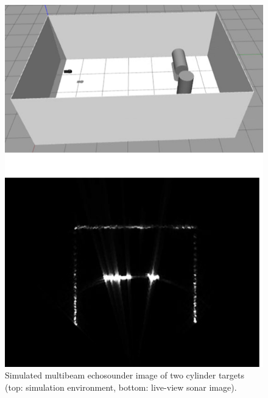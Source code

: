 \documentclass[utf8]{frontiersSCNS} %
\begin{document}
\begin{figure}[t]
  \centering
  \includegraphics[width=\columnwidth]{images/two_cylinder_straight.png}
  \caption{Simulated multibeam echosounder image of two cylinder targets (top: simulation environment, bottom: live-view sonar image).}
  \label{f:two_cylinder_straight}
\end{figure} 
\end{document}
